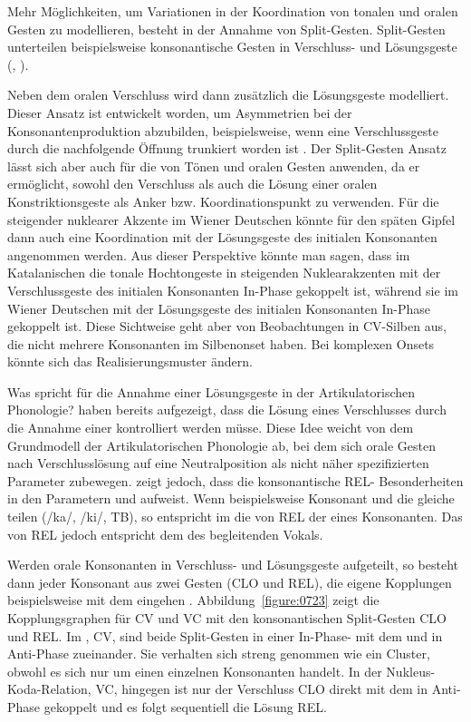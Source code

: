 Mehr Möglichkeiten, um Variationen in der Koordination von tonalen und oralen Gesten zu modellieren, besteht in der Annahme von Split-Gesten. Split-Gesten unterteilen beispielsweise konsonantische Gesten in Verschluss- und Lösungsgeste (\citealt{Nam2007b,Nam2007a}, \citealt{Pouplier2011a}).%

Neben dem oralen Verschluss wird dann zusätzlich die Lösungsgeste modelliert. Dieser Ansatz ist entwickelt worden, um Asymmetrien bei der Konsonantenproduktion abzubilden, beispielsweise, wenn eine Verschlussgeste durch die nachfolgende Öffnung trunkiert worden ist \citep{Harrington1995}. Der Split-Gesten Ansatz lässt sich aber auch für die  von Tönen und oralen Gesten anwenden, da er ermöglicht, sowohl den Verschluss als auch die Lösung einer oralen Konstriktionsgeste als Anker bzw. Koordinationspunkt zu verwenden. Für die  steigender nuklearer Akzente im Wiener Deutschen könnte für den späten Gipfel dann auch eine Koordination mit der Lösungsgeste des initialen Konsonanten angenommen werden. Aus dieser Perspektive könnte man sagen, dass im Katalanischen die tonale Hochtongeste in steigenden Nuklearakzenten mit der Verschlussgeste des initialen Konsonanten In-Phase gekoppelt ist, während sie im Wiener Deutschen mit der Lösungsgeste des initialen Konsonanten In-Phase gekoppelt ist. Diese Sichtweise geht aber von Beobachtungen in CV-Silben aus, die nicht mehrere Konsonanten im Silbenonset haben. Bei komplexen Onsets könnte sich das Realisierungsmuster ändern.

Was spricht für die Annahme einer Lösungsgeste in der Artikulatorischen Phonologie? \citet{Browman1992b} haben bereits aufgezeigt, dass die Lösung eines Verschlusses durch die Annahme einer  kontrolliert werden müsse. Diese Idee weicht von dem Grundmodell der Artikulatorischen Phonologie ab, bei dem sich orale Gesten nach Verschlusslösung auf eine Neutralposition als nicht näher spezifizierten Parameter zubewegen. \citet{Nam2007b} zeigt jedoch, dass die konsonantische REL- Besonderheiten in den Parametern  und  aufweist. Wenn beispielsweise Konsonant und  die gleiche  teilen (/ka/, /ki/,  TB), so entspricht im  die  von REL der  eines Konsonanten. Das  von REL jedoch entspricht dem  des begleitenden Vokals.

Werden orale Konsonanten in Verschluss- und Lösungsgeste aufgeteilt, so besteht dann jeder Konsonant aus zwei Gesten (CLO und REL), die eigene Kopplungen beispielsweise mit dem  eingehen \citep{Nam2007b, Nam2007a}. Abbildung~\ref{figure:0723} zeigt die Kopplungsgraphen für CV und VC mit den konsonantischen Split-Gesten CLO und REL. Im , CV, sind beide Split-Gesten in einer In-Phase- mit dem  und in Anti-Phase zueinander. Sie verhalten sich streng genommen wie ein Cluster, obwohl es sich nur um einen einzelnen Konsonanten handelt. In der Nukleus-Koda-Relation, VC, hingegen ist nur der Verschluss CLO direkt mit dem  in Anti-Phase gekoppelt und es folgt sequentiell die Lösung REL.

